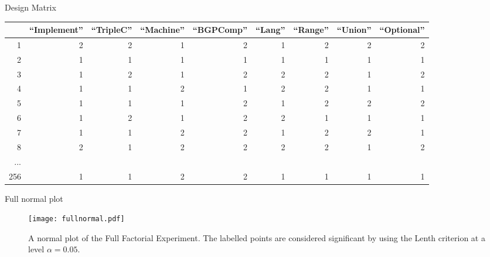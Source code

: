 \documentclass[english,handout,aspectratio=169]{ifislide}
\begin{document}
\begin{frame}{Design Matrix}
\begin{table}[ht]
\begin{center}
\begin{tabular}{r|rrrrrrrr}
  \hline
 & ``Implement'' & ``TripleC'' & ``Machine'' & ``BGPComp'' & ``Lang'' & ``Range'' & ``Union'' & ``Optional'' \\ 
  \hline
1 & 2 & 2 & 1 & 2 & 1 & 2 & 2 & 2 \\ 
  2 & 1 & 1 & 1 & 1 & 1 & 1 & 1 & 1 \\ 
  3 & 1 & 2 & 1 & 2 & 2 & 2 & 1 & 2 \\ 
  4 & 1 & 1 & 2 & 1 & 2 & 2 & 1 & 1 \\ 
  5 & 1 & 1 & 1 & 2 & 1 & 2 & 2 & 2 \\ 
  6 & 1 & 2 & 1 & 2 & 2 & 1 & 1 & 1 \\ 
  7 & 1 & 1 & 2 & 2 & 1 & 2 & 2 & 1 \\ 
  8 & 2 & 1 & 2 & 2 & 2 & 2 & 1 & 2 \\ 
 ...  \\
  256 & 1 & 1 & 2 & 2 & 1 & 1 & 1 & 1 \\ 
   \hline
\end{tabular}
\end{center}
\end{table}
\end{frame}


\begin{frame}{Full normal plot}
\begin{figure}[t]
  \centerline{%
  \texttt{[image: fullnormal.pdf]}}
  \caption{A normal plot of the Full Factorial Experiment. The
    labelled points are considered significant by using the Lenth
    criterion at a level $\alpha=0.05$.}\label{fig:fullnormal}
\end{figure}

\end{frame}
\end{document}
